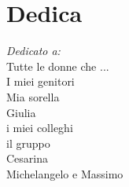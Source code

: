 
\chapter*{Dedica}


\textit{Dedicato a:}\\
Tutte le donne che ...\\
I miei genitori\\
Mia sorella\\
Giulia\\
i miei colleghi\\
il gruppo\\
Cesarina\\
Michelangelo e Massimo

